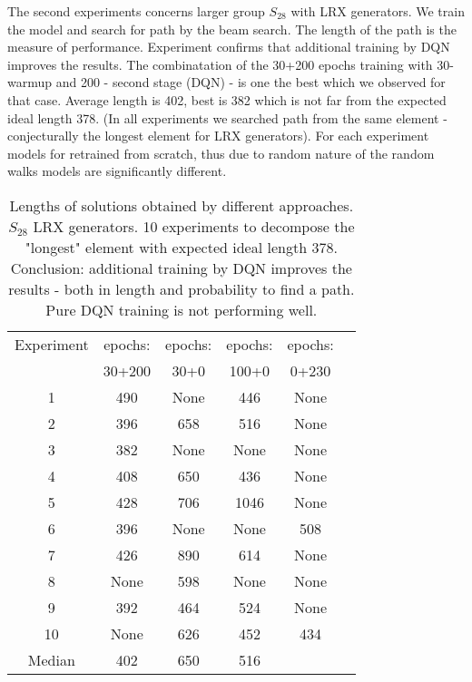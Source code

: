 \documentclass[atmp]{ipart_v1}
\numberwithin{equation}{section}
\theoremstyle{plain}%
\begin{document}
The second experiments concerns larger group $S_{28}$ with LRX generators. We train the model and search for path by the beam search. The length of the path is the measure of performance. Experiment confirms that additional training by DQN improves the results. The combinatation of the 30+200 epochs training with 30-warmup and   200 - second stage (DQN) - is one the best which we observed for that case. Average length is 402, best is 382 which is not far from the expected ideal length 378. (In all experiments we searched path from the same element - conjecturally the longest element for LRX generators). For each experiment models for retrained from scratch, thus due to random nature of the random walks models are significantly different. 
\begin{table}[h]
    \centering
    \begin{tabular}{|c|c|c|c|c|c|}
        \hline
        Experiment  & epochs:  & epochs:   & epochs: & epochs:    \\
                    &  30+200  &  30+0   & 100+0 &  0+230   \\
        \hline
        1 &  490 & None  & 446  &  None \\%
        2 &  396 & 658   & 516  &  None \\%
        3 &  382 & None  & None  & None  \\%
        4 &  408 & 650   & 436  &  None \\ %
        5 &  428 & 706   & 1046  & None  \\ %
        6 &  396 & None  & None  & 508  \\ %
        7 &  426 & 890   & 614  &  None \\ %
        8 &  None& 598   & None &  None \\ %
        9 &  392 & 464   & 524  &  None  \\ %
        10 & None& 626   & 452  &  434 \\ %
        Median & 402& 650   & 516 &   \\
        \hline
    \end{tabular}
    \captionsetup{skip=10pt} 
    \caption{Lengths of solutions obtained by different approaches. 
    $S_{28}$ LRX generators. 10 experiments to decompose the "longest" element with expected ideal length 378. Conclusion: additional training by DQN improves the results - both in length and probability to find a path. Pure DQN training is not performing well. }
    \label{tab:example}
\end{table}
\end{document}
